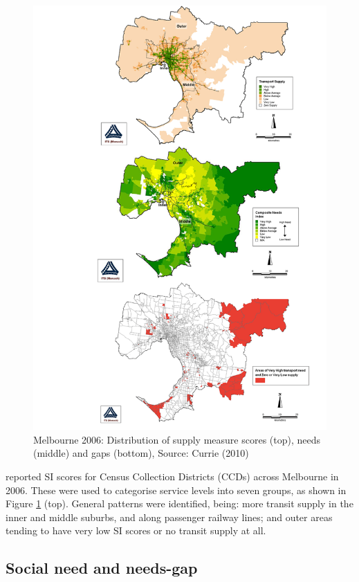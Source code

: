 \documentclass[preprint, 3p,
authoryear]{elsarticle} %
\begin{document}
\begin{figure}
\includegraphics[width=0.9\linewidth]{graphics/Currie2010combined1} \caption{Melbourne 2006: Distribution of supply measure scores (top), needs (middle) and gaps (bottom), Source: Currie (2010)}\label{fig:Currie_map_SI}
\end{figure}

\citet{currie2010identifying} reported SI scores for Census Collection
Districts (CCDs) across Melbourne in 2006. These were used to categorise
service levels into seven groups, as shown in Figure
\ref{fig:Currie_map_SI} (top). General patterns were identified, being:
more transit supply in the inner and middle suburbs, and along passenger
railway lines; and outer areas tending to have very low SI scores or no
transit supply at all.

\subsection{Social need and needs-gap}\label{social-need-and-needs-gap}
\end{document}
